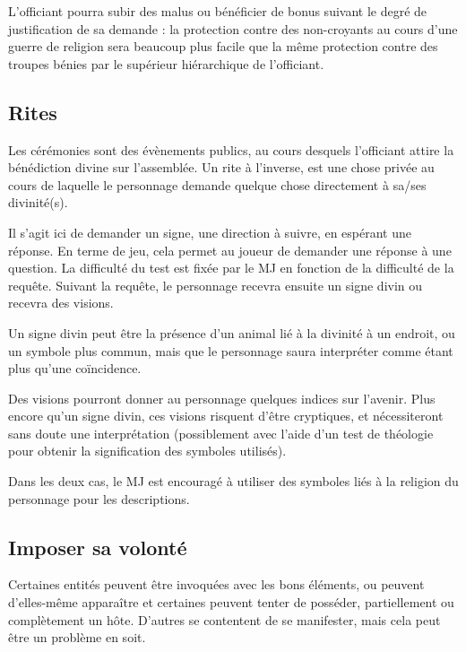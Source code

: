 \documentclass[10pt,a4paper,twocolumn]{book}
\begin{document}
L'officiant pourra subir des malus ou bénéficier de bonus suivant le degré de justification de sa demande : la protection contre des non-croyants au cours d'une guerre de religion sera beaucoup plus facile que la même protection contre des troupes bénies par le supérieur hiérarchique de l'officiant.

\subsection{Rites}
Les cérémonies sont des évènements publics, au cours desquels l'officiant attire la bénédiction divine sur l'assemblée. Un rite à l'inverse, est une chose privée au cours de laquelle le personnage demande quelque chose directement à sa/ses divinité(s).

Il s'agit ici de demander un signe, une direction à suivre, en espérant une réponse. En terme de jeu, cela permet au joueur de demander une réponse à une question. La difficulté du test est fixée par le MJ en fonction de la difficulté de la requête. 
Suivant la requête, le personnage recevra ensuite un signe divin ou recevra des visions.

Un signe divin peut être la présence d'un animal lié à la divinité à un endroit, ou un symbole plus commun, mais que le personnage saura interpréter comme étant plus qu'une coïncidence.

Des visions pourront donner au personnage quelques indices sur l'avenir. Plus encore qu'un signe divin, ces visions risquent d'être cryptiques, et nécessiteront sans doute une interprétation (possiblement avec l'aide d'un test de théologie pour obtenir la signification des symboles utilisés).

Dans les deux cas, le MJ est encouragé à utiliser des symboles liés à la religion du personnage pour les descriptions.
\subsection{Imposer sa volonté}
Certaines entités peuvent être invoquées avec les bons éléments, ou peuvent d'elles-même apparaître et certaines peuvent tenter de posséder, partiellement ou complètement un hôte. D'autres se contentent de se manifester, mais cela peut être un problème en soit. 
\end{document}
